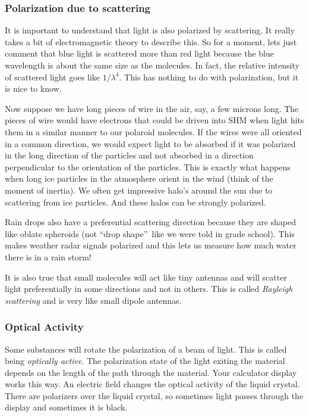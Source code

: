\documentclass{article}
\begin{document}
\subsubsection{Polarization due to scattering}

It is important to understand that light is also polarized by scattering. It
really takes a bit of electromagnetic theory to describe this. So for a
moment, lets just comment that blue light is scattered more than red light
because the blue wavelength is about the same size as the molecules. In
fact, the relative intensity of scattered light goes like $1/\lambda ^{4}.$
This has nothing to do with polarization, but it is nice to know.

Now suppose we have long pieces of wire in the air, say, a few microns long.
The pieces of wire would have electrons that could be driven into SHM when
light hits them in a similar manner to our polaroid molecules. If the wires
were all oriented in a common direction, we would expect light to be
absorbed if it was polarized in the long direction of the particles and not
absorbed in a direction perpendicular to the orientation of the particles.
This is exactly what happens when long ice particles in the atmosphere
orient in the wind (think of the moment of inertia). We often get impressive
halo's around the sun due to scattering from ice particles. And these halos
can be strongly polarized.

Rain drops also have a preferential scattering direction because they are
shaped like oblate spheroids (not \textquotedblleft drop
shape\textquotedblright\ like we were told in grade school). This makes
weather radar signals polarized and this lets us measure how much water
there is in a rain storm!

It is also true that small molecules will act like tiny antennas and will
scatter light preferentially in some directions and not in others. This is
called \emph{Rayleigh scattering} and is very like small dipole antennas.

\subsubsection{Optical Activity}

Some substances will rotate the polarization of a beam of light. This is
called being \emph{optically active}. The polarization state of the light
exiting the material depends on the length of the path through the material.
Your calculator display works this way. An electric field changes the
optical activity of the liquid crystal. There are polarizers over the liquid
crystal, so sometimes light passes through the display and sometimes it is
black.
\end{document}
